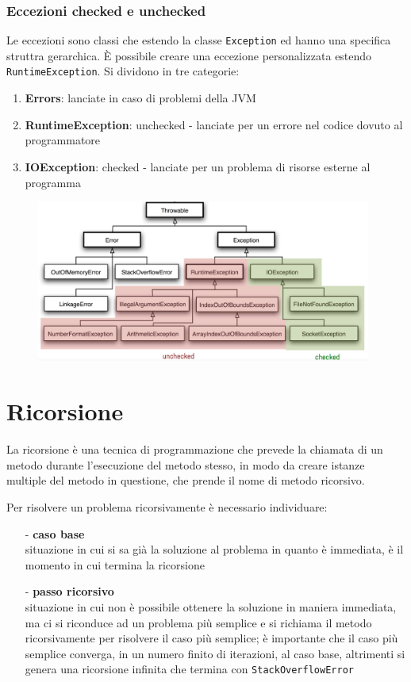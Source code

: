 \documentclass{article}
\begin{document}
\subsubsection*{Eccezioni checked e unchecked}
Le eccezioni sono classi che estendo la classe \verb|Exception| ed hanno una specifica struttra gerarchica. È possibile creare
una eccezione personalizzata estendo \verb|RuntimeException|. Si dividono in tre categorie:
\begin{enumerate} [topsep=3pt, itemsep=0pt]
	\item \textbf{Errors}: lanciate in caso di problemi della JVM
	\item \textbf{RuntimeException}: unchecked - lanciate per un errore nel codice dovuto al programmatore
	\item \textbf{IOException}: checked - lanciate per un problema di risorse esterne al programma
\end{enumerate}

\begin{figure}[h]
	\centering
	\includegraphics[width=11cm]{eccezioni.png}
\end{figure}

\newpage


\section{Ricorsione}
La ricorsione è una tecnica di programmazione che prevede la chiamata di un metodo durante l'esecuzione del metodo stesso, in modo
da creare istanze multiple del metodo in questione, che prende il nome di metodo ricorsivo.

Per risolvere un problema ricorsivamente è necessario individuare:
\begin{itemize} [topsep=3pt, itemsep=0pt]
	\item[-] \textbf{caso base} \\
	situazione in cui si sa già la soluzione al problema in quanto è immediata, è il momento in cui termina la ricorsione 
	\item[-] \textbf{passo ricorsivo} \\
	situazione in cui non è possibile ottenere la soluzione in maniera immediata, ma ci si riconduce ad un problema più semplice e
	si richiama il metodo ricorsivamente per risolvere il caso più semplice; è importante che il caso più semplice converga, in un
	numero finito di iterazioni, al caso base, altrimenti si genera una ricorsione infinita che termina con \verb|StackOverflowError|
\end{itemize}
\end{document}
